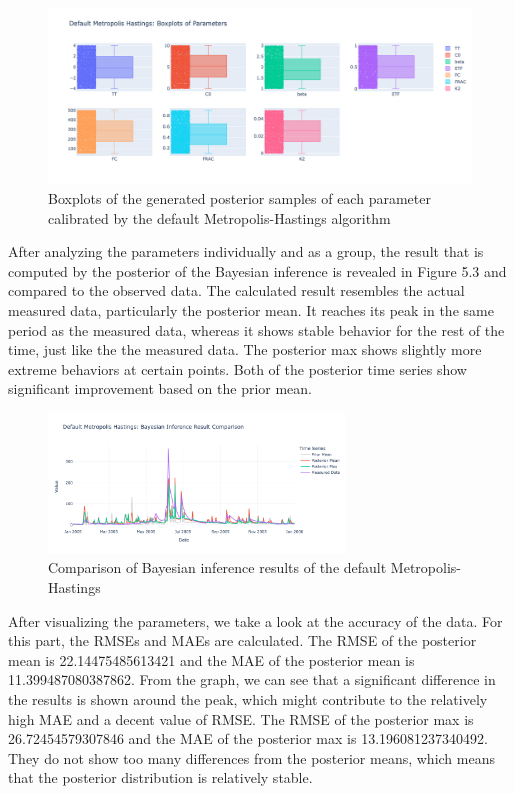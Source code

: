 \begin{figure}[H]
    \centering
    \includegraphics[width=1\textwidth]{figures/basic_mh/default_mh/default_mh_boxplot.png}
    \captionsetup{width=.8\textwidth}
    \caption{Boxplots of the generated posterior samples of each parameter calibrated by the default Metropolis-Hastings algorithm}
    \label{fig:enter-label}
\end{figure}



After analyzing the parameters individually and as a group, the result that is computed by the posterior of the Bayesian inference is revealed in Figure 5.3 and compared to the observed data. The calculated result resembles the actual measured data, particularly the posterior mean. It reaches its peak in the same period as the measured data, whereas it shows stable behavior for the rest of the time, just like the the measured data. The posterior max shows slightly more extreme behaviors at certain points. Both of the posterior time series show significant improvement based on the prior mean. 


\begin{figure}[H]
    \centering
    \includegraphics[width=0.7\textwidth]{figures/basic_mh/default_mh/default_mh_bayes.png}
    \captionsetup{width=.8\textwidth}
    \caption{Comparison of Bayesian inference results of the default Metropolis-Hastings}
    \label{fig:enter-label}
\end{figure}

After visualizing the parameters, we take a look at the accuracy of the data. For this part, the RMSEs and MAEs are calculated. The RMSE of the posterior mean is 22.14475485613421 and the MAE of the posterior mean is 11.399487080387862. From the graph, we can see that a significant difference in the results is shown around the peak, which might contribute to the relatively high MAE and a decent value of RMSE. The RMSE of the posterior max is 26.72454579307846 and the MAE of the posterior max is 13.196081237340492. They do not show too many differences from the posterior means, which means that the posterior distribution is relatively stable. 

